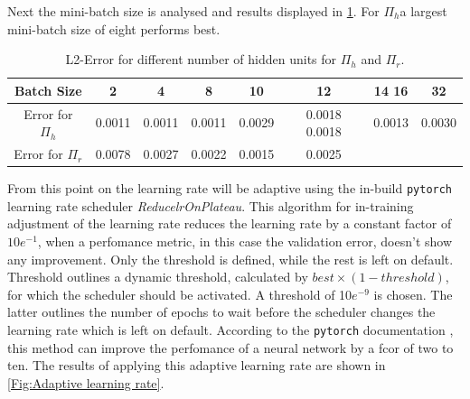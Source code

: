 \documentclass[12pt, a4paper]{article}
\newcommand{\hy}{\(\Pi_h\)}
\begin{document}
Next the mini-batch size is analysed and results displayed in \cref{Tab:Batch Size}. For \hy a largest mini-batch size of eight performs best. 
\begin{table}[!htbp]\centering
	\begin{tabular}{ |c|c|c|c|c|c|c|c| }
		\hline
		Batch Size & 2 & 4 & 8 & 10 & 12 & 14 16 & 32 \\ [.5ex]
		\hline
		Error for \(\Pi_h\) & 0.0011 & 0.0011 & 0.0011 & 0.0029 & 0.0018 0.0018 & 0.0013 & 0.0030\\ \hline
		Error for \(\Pi_r\)& 0.0078 & 0.0027 & 0.0022 & 0.0015 & 0.0025\\ \hline
	\end{tabular}
	\caption{L2-Error for different number of hidden units for \(\Pi_h\) and \(\Pi_r\).}
	\label{Tab:Batch Size}
\end{table}
From this point on the learning rate will be adaptive using the in-build \texttt{pytorch} learning rate scheduler \textit{ReducelrOnPlateau}. This algorithm for in-training adjustment of the learning rate reduces the learning rate by a constant factor of \(10e^{-1}\), when a perfomance metric, in this case the validation error, doesn't show any improvement. Only the threshold is defined, while the rest is left on default. Threshold outlines a dynamic threshold, calculated by \(best \times (1-threshold)\), for which the scheduler should be activated. A threshold of 10\(e^{-9}\) is chosen. The latter outlines the number of epochs to wait before the scheduler changes the learning rate which is left on default.
According to the \texttt{pytorch} documentation \cite{bibid}, this method can improve the perfomance of a neural network by a fcor of two to ten. The results of applying this adaptive learning rate are shown in \cref{Fig:Adaptive learning rate}.
\end{document}

